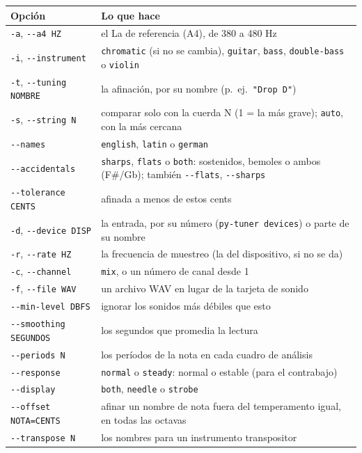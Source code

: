 \documentclass[12pt,
              article,
              oneside
              ]{memoir}
\begin{document}
\begin{longtable}{@{}lp{}@{}}
\toprule
Opción & Lo que hace\\
\midrule
\endhead
\texttt{-a}, \texttt{-{}-a4 HZ} & el La de referencia (A4), de 380 a 480 Hz\\
\texttt{-i}, \texttt{-{}-instrument} & \texttt{chromatic} (si no se cambia), \texttt{guitar}, \texttt{bass}, \texttt{double-bass} o \texttt{violin}\\
\texttt{-t}, \texttt{-{}-tuning NOMBRE} & la afinación, por su nombre (p.~ej.\ \texttt{"Drop D"})\\
\texttt{-s}, \texttt{-{}-string N} & comparar solo con la cuerda N (1 = la más grave); \texttt{auto}, con la más cercana\\
\texttt{-{}-names} & \texttt{english}, \texttt{latin} o \texttt{german}\\
\texttt{-{}-accidentals} & \texttt{sharps}, \texttt{flats} o \texttt{both}: sostenidos, bemoles o ambos (F\#/Gb); también \texttt{-{}-flats}, \texttt{-{}-sharps}\\
\texttt{-{}-tolerance CENTS} & afinada a menos de estos cents\\
\texttt{-d}, \texttt{-{}-device DISP} & la entrada, por su número (\texttt{py-tuner devices}) o parte de su nombre\\
\texttt{-r}, \texttt{-{}-rate HZ} & la frecuencia de muestreo (la del dispositivo, si no se da)\\
\texttt{-c}, \texttt{-{}-channel} & \texttt{mix}, o un número de canal desde 1\\
\texttt{-f}, \texttt{-{}-file WAV} & un archivo WAV en lugar de la tarjeta de sonido\\
\texttt{-{}-min-level DBFS} & ignorar los sonidos más débiles que esto\\
\texttt{-{}-smoothing SEGUNDOS} & los segundos que promedia la lectura\\
\texttt{-{}-periods N} & los períodos de la nota en cada cuadro de análisis\\
\texttt{-{}-response} & \texttt{normal} o \texttt{steady}: normal o estable (para el contrabajo)\\
\texttt{-{}-display} & \texttt{both}, \texttt{needle} o \texttt{strobe}\\
\texttt{-{}-offset NOTA=CENTS} & afinar un nombre de nota fuera del temperamento igual, en todas las octavas\\
\texttt{-{}-transpose N} & los nombres para un instrumento transpositor\\

\end{longtable}
\end{document}
